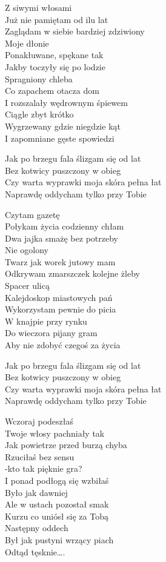 \begin{text}
Z siwymi włosami\\
Już nie pamiętam od ilu lat\\
Zaglądam w siebie bardziej zdziwiony\\
Moje dłonie\\
Ponakłuwane, spękane tak\\
Jakby toczyły się po lodzie\\
Spragniony chleba\\
Co zapachem otacza dom\\
I rozszalały wędrownym śpiewem\\
Ciągle zbyt krótko\\
Wygrzewany gdzie niegdzie kąt\\
I zapomniane gęste spowiedzi

Jak po brzegu fala ślizgam się od lat\\
Bez kotwicy puszczony w obieg\\
Czy warta wyprawki moja skóra pełna łat\\
Naprawdę oddycham tylko przy Tobie

Czytam gazetę\\
Połykam życia codzienny chłam\\
Dwa jajka smażę bez potrzeby\\
Nie ogolony\\
Twarz jak worek jutowy mam\\
Odkrywam zmarszczek kolejne żleby\\
Spacer ulicą\\
Kalejdoskop miastowych pań\\
Wykorzystam pewnie do picia\\
W knajpie przy rynku\\
Do wieczora pijany gram\\
Aby nie zdobyć czegoś za życia

Jak po brzegu fala ślizgam się od lat\\
Bez kotwicy puszczony w obieg\\
Czy warta wyprawki moja skóra pełna łat\\
Naprawdę oddycham tylko przy Tobie

Wczoraj podeszłaś\\
Twoje włosy pachniały tak\\
Jak powietrze przed burzą chyba\\
Rzuciłaś bez sensu\\
-kto tak pięknie gra?\\
I ponad podłogą się wzbiłaś\\
Było jak dawniej\\
Ale w ustach pozostał smak\\
Kurzu co uniósł się za Tobą\\
Następny oddech\\
Był jak pustyni wrzący piach\\
Odtąd tęsknie….


\end{text}
